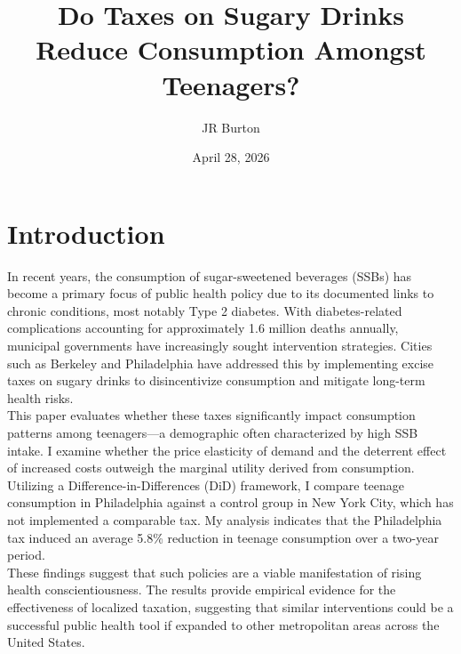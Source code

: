 \documentclass[12pt, a4paper]{article}
\title{\huge Do Taxes on Sugary Drinks Reduce Consumption Amongst Teenagers?}
\author{JR Burton}
\date {April 28, 2026}
\begin{document}
\maketitle

\onehalfspacing

\section{Introduction}

In recent years, the consumption of sugar-sweetened beverages (SSBs) has become a primary focus of public health policy due to its documented links to chronic conditions, most notably Type 2 diabetes. With diabetes-related complications accounting for approximately 1.6 million deaths annually, municipal governments have increasingly sought intervention strategies. Cities such as Berkeley and Philadelphia have addressed this by implementing excise taxes on sugary drinks to disincentivize consumption and mitigate long-term health risks.
\\

This paper evaluates whether these taxes significantly impact consumption patterns among teenagers—a demographic often characterized by high SSB intake. I examine whether the price elasticity of demand and the deterrent effect of increased costs outweigh the marginal utility derived from consumption. Utilizing a Difference-in-Differences (DiD) framework, I compare teenage consumption in Philadelphia against a control group in New York City, which has not implemented a comparable tax. My analysis indicates that the Philadelphia tax induced an average 5.8\% reduction in teenage consumption over a two-year period.
\\

These findings suggest that such policies are a viable manifestation of rising health conscientiousness. The results provide empirical evidence for the effectiveness of localized taxation, suggesting that similar interventions could be a successful public health tool if expanded to other metropolitan areas across the United States.
\end{document}
